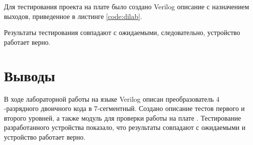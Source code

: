 Для тестирования проекта на плате было создано Verilog описание с назначением выходов, приведенное в листинге  \ref{code:dilab}.


Результаты тестирования совпадают с ожидаемыми, следовательно, устройство работает верно.

\section{Выводы}

В ходе лабораторной работы на языке Verilog описан преобразователь $4$-разрядного двоичного кода в $7$-сегментный. Создано описание тестов первого и второго уровней, а также модуль для проверки работы на плате . Тестирование разработанного устройства показало, что результаты совпадают с ожидаемыми и устройство работает верно.

